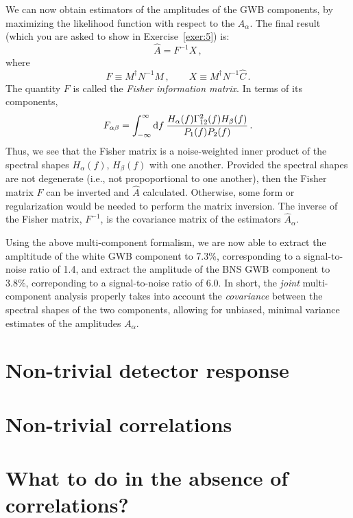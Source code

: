 \documentclass[11pt]{article}
\numberwithin{equation}{section}
\def\be{\begin{equation}}
\def\ee{\end{equation}}
\def\D{{\rm d}}
\begin{document}
We can now obtain estimators of the amplitudes of the 
GWB components, by maximizing the likelihood function 
with respect to the $A_\alpha$.
The final result (which you are asked to show in 
Exercise~\ref{exer:5}) is: 
%
\be
\hat A = F^{-1} X\,,
\ee
%
where
%
\be
F\equiv M^\dagger N^{-1} M\,,
\qquad 
X\equiv M^\dagger N^{-1} \hat C\,.
\ee
%
The quantity $F$ is called the 
{\em Fisher information matrix}.
In terms of its components,
%
\be
F_{\alpha\beta} = \int_{-\infty}^\infty \D f\> \frac{H_\alpha(f)\Gamma_{12}^2(f)H_\beta(f)}
{P_1(f)P_2(f)}\,.
\ee
%
Thus, we see that the Fisher matrix is a noise-weighted 
inner product 
of the spectral shapes $H_\alpha(f)$, $H_\beta(f)$ with one 
another.
Provided the spectral shapes are not degenerate (i.e., not 
propoportional to one another), then the Fisher matrix $F$
can be inverted and $\hat A$ calculated.
Otherwise, some form or regularization would be needed to 
perform the matrix inversion.
The inverse of the Fisher matrix, $F^{-1}$, is the covariance 
matrix of the estimators $\hat A_\alpha$.  

Using the above multi-component formalism, we are now able 
to extract the ampltitude of the white GWB component to 7.3\%, 
corresponding to a signal-to-noise ratio of 1.4, 
and extract
the amplitude of the BNS GWB component to 3.8\%,
correponding to a signal-to-noise ratio of 6.0.
In short, the {\em joint} multi-component analysis 
properly takes into account the {\em covariance}
between the spectral shapes of the two components, 
allowing for unbiased, minimal variance estimates of 
the amplitudes $A_\alpha$.

\section{Non-trivial detector response}
\label{s:nontrivial_response}

\section{Non-trivial correlations}
\label{s:nontrivial_correlations}

\section{What to do in the absence of correlations?}
\end{document}
